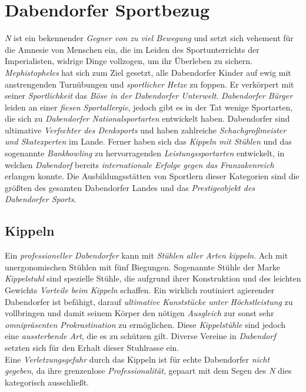 \section{{Dabendorfer Sportbezug}}
\textit{N} ist ein bekennender \textit{Gegner von zu viel Bewegung} und setzt sich vehement für die Amnesie von Menschen ein, die im Leiden des Sportunterrichts der Imperialisten, widrige Dinge vollzogen, um ihr Überleben zu sichern. \textit{Mephistopheles} hat sich zum Ziel gesetzt, alle Dabendorfer Kinder auf ewig mit anstrengenden Turnübungen und \textit{sportlicher Hetze} zu foppen. Er verkörpert mit seiner \textit{Sportlichkeit} das \textit{Böse in der Dabendorfer Unterwelt}. \textit{Dabendorfer Bürger} leiden an einer \textit{fiesen Sportallergie}, jedoch gibt es in der Tat wenige Sportarten, die sich zu \textit{Dabendorfer Nationalsportarten} entwickelt haben. Dabendorfer sind ultimative \textit{Verfechter des Denksports} und haben zahlreiche \textit{Schachgroßmeister und Skatexperten} im Lande. Ferner haben sich das \textit{Kippeln mit Stühlen} und das sogenannte \textit{Bankbowling} zu hervorragenden \textit{Leistungssportarten} entwickelt, in welchen \textit{Dabendorf} bereits \textit{internationale Erfolge gegen das Franzakenreich} erlangen konnte. Die Ausbildungsstätten von Sportlern dieser Kategorien sind die größten des gesamten Dabendorfer Landes und das \textit{Prestigeobjekt des Dabendorfer Sports}.

\subsection{{Kippeln}}
Ein \textit{professioneller Dabendorfer} kann mit \textit{Stühlen aller Arten kippeln}. Ach mit unergonomischen Stühlen mit fünf Biegungen. Sogenannte Stühle der Marke \textit{Kippelstuhl} sind spezielle Stühle, die aufgrund ihrer Konstruktion und des leichten Gewichts \textit{Vorteile beim Kippeln} schaffen. Ein wirklich routiniert agierender Dabendorfer ist befähigt, darauf \textit{ultimative Kunststücke unter Höchstleistung} zu vollbringen und damit seinem Körper den nötigen \textit{Ausgleich} zur sonst sehr \textit{omnipräsenten Prokrastination} zu ermöglichen. Diese \textit{Kippelstühle} sind jedoch eine \textit{aussterbende Art}, die es zu schützen gilt. Diverse Vereine in \textit{Dabendorf} setzten sich für den Erhalt dieser Stuhlrasse ein.\\
Eine \textit{Verletzungsgefahr} durch das Kippeln ist für echte Dabendorfer \textit{nicht gegeben}, da ihre grenzenlose \textit{Professionalität}, gepaart mit dem Segen des \textit{N} dies kategorisch ausschließt.

